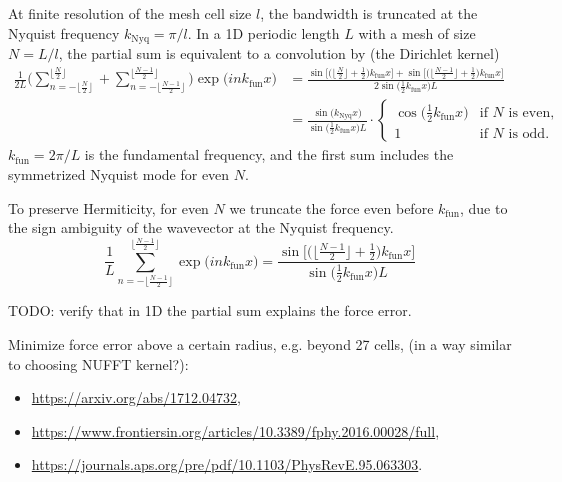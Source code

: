 \documentclass[a4paper]{article}
\newcommand{\knyq}{k_\mathrm{Nyq}}
\newcommand{\kfun}{k_\mathrm{fun}}
\newcommand{\YL}[1]{\textcolor{Bittersweet}{#1}}
\begin{document}
At finite resolution of the mesh cell size $l$, the bandwidth is
truncated at the Nyquist frequency $\knyq = \pi / l$.
In a 1D periodic length $L$ with a mesh of size $N = L / l$, the
partial sum is equivalent to a convolution by (the Dirichlet kernel)
%
\begin{align}
\frac1{2 L} \Bigg(
  \sum_{n=-\lfloor \frac{N}2\rfloor}^{\lfloor \frac{N}2\rfloor}
  + \sum_{n=-\lfloor \frac{N-1}2\rfloor}^{\lfloor \frac{N-1}2\rfloor}
\Bigg)
\exp\bigl( i n\kfun x \bigr)
%
&= \frac{
  \sin \bigl[
    \bigl( \bigl\lfloor\frac{N}2\bigr\rfloor + \frac12 \bigr) \kfun x
  \bigr]
  + \sin \bigl[
    \bigl( \bigl\lfloor\frac{N-1}2\bigr\rfloor + \frac12 \bigr) \kfun x
  \bigr]
}{2 \sin \bigl( \frac12 \kfun x \bigr) L} \nonumber\\
%
&= \frac{\sin \bigl( \knyq x \bigr)}
        {\sin \bigl( \frac12 \kfun x \bigr) L}
  \cdot \begin{cases}
    \cos \bigl( \frac12 \kfun x \bigr) & \text{if } N \text{ is even}, \\
    1 & \text{if } N \text{ is odd}.
  \end{cases}
\end{align}
%
$\kfun = 2\pi / L$ is the fundamental frequency, and the first sum
includes the symmetrized Nyquist mode for even $N$.

To preserve Hermiticity, for even $N$ we truncate the force even before
$\kfun$, due to the sign ambiguity of the wavevector at the Nyquist
frequency.
%
\begin{equation}
\frac1L
  \sum_{n=-\lfloor \frac{N-1}2\rfloor}^{\lfloor \frac{N-1}2\rfloor}
  \exp\bigl( i n\kfun x \bigr)
%
= \frac{\sin \bigl[
    \bigl( \bigl\lfloor\frac{N-1}2\bigr\rfloor + \frac12 \bigr) \kfun x
  \bigr]
}{\sin \bigl( \frac12 \kfun x \bigr) L}
\end{equation}


\YL{TODO: verify that in 1D the partial sum explains the force error.}


\YL{Minimize force error above a certain radius, e.g. beyond 27 cells,
(in a way similar to choosing NUFFT kernel?):
\begin{itemize}
\item \url{https://arxiv.org/abs/1712.04732},
\item \url{https://www.frontiersin.org/articles/10.3389/fphy.2016.00028/full},
\item \url{https://journals.aps.org/pre/pdf/10.1103/PhysRevE.95.063303}.
\end{itemize}
}
\end{document}
